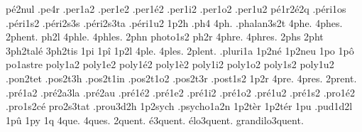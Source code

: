 {                    p\'e2nul %
                    .pe4r
                    .per1a2
                    .per1e2
                    .per1\'e2
                    .per1i2
                    .per1o2
                    .per1u2
                    p\'e1r2\'e2q %
                    .p\'eri1os
                    .p\'eri1s2
                    .p\'eri2s3s
                    .p\'eri2s3ta
                    .p\'eri1u2
1p2h
.ph4
4ph.
                    .phalan3s2t
4phe.
4phes.
2phent. %
ph2l
4phle.
4phles.
2phn
                    photo1s2
ph2r
4phre.
4phres.
2phs
2pht
                    3ph2tal\'e
                    3ph2tis
1pi
1p\^i
1p2l
4ple.
4ples.
2plent. %
                    .pluri1a
                    1p2n\'e
                    1p2neu
1po
1p\^o
                    po1astre
                    poly1a2
                    poly1e2
                    poly1\'e2
                    poly1\`e2
                    poly1i2
                    poly1o2
                    poly1s2
                    poly1u2
                    .pon2tet %
                    .pos2t3h
                    .pos2t1in
                    .pos2t1o2
                    .pos2t3r
                    .post1s2
1p2r
4pre.
4pres.
2prent. %
                    .pr\'e1a2
                    .pr\'e2a3la %
                    .pr\'e2au
                    .pr\'e1\'e2
                    .pr\'e1e2
                    .pr\'e1i2
                    .pr\'e1o2
                    .pr\'e1u2
                    .pr\'e1s2
                    .pro1\'e2
                    .pro1s2c\'e
                    pro2s3tat
                    .prou3d2h
                    1p2sych
                    .psycho1a2n
                    1p2t\`er
                    1p2t\'er
1pu
                    .pud1d2l
1p\^u
1py
1q
4que.
4ques.
        2quent.
     \'e3quent.
   \'elo3quent.
grandilo3quent.
}
